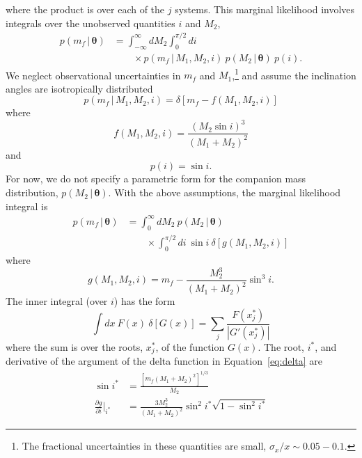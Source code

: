 \documentclass[apjl]{emulateapj}
\newcommand{\given}{\,|\,}
\newcommand{\bs}[1]{\boldsymbol{#1}}
\newcommand{\eqn}{Equation~}
\newcommand{\mf}{m_f}
\begin{document}
where the product is over each of the $j$ systems.  This marginal likelihood involves integrals over the unobserved quantities $i$ and $M_2$,
\begin{align}
    p(\mf \given \bs{\theta}) &= \int_{-\infty}^\infty dM_2 \int_0^{\pi/2} di  \nonumber \\
      & \qquad {} \times p(\mf \given M_1, M_2, i)~p(M_2 \given \bs{\theta})~p(i).
\end{align}
We neglect observational uncertainties in $\mf$ and $M_1$,\footnote{The fractional uncertainties in these quantities are small, $\sigma_x / x \sim 0.05-0.1$.} and assume the inclination angles are isotropically distributed
\begin{equation}
	p(\mf \given M_1, M_2, i) = \delta \left[\mf - f(M_1, M_2, i) \right]
\end{equation}
where
\begin{equation}
	f(M_1, M_2, i) = \frac{(M_2 \sin i)^3}{(M_1 + M_2)^2}
\end{equation}
and
\begin{equation}
	p(i) = \sin i.
\end{equation}
For now, we do not specify a parametric form for the companion mass distribution, $p(M_2 \given \bs{\theta})$. With the above assumptions, the marginal likelihood integral is
\begin{align}
    p(\mf \given \bs{\theta}) &= \int_{0}^\infty dM_2 ~p(M_2 \given \bs{\theta})  \nonumber \\
    & \qquad {} \times \int_0^{\pi/2} di ~\sin i ~ \delta \left[g(M_1,M_2,i) \right]\label{eq:delta}
\end{align}
where
\begin{equation}
	g(M_1,M_2,i) = \mf - \frac{M_2^3}{(M_1+M_2)^2}\sin^3 i.
\end{equation}
The inner integral (over $i$) has the form
\begin{equation}
    \int dx~F(x)~\delta \left[ G(x) \right] = \sum_j \frac{F(x^*_j)}{|G'(x^*_j)|}
\end{equation}
where the sum is over the roots, $x^*_j$, of the function $G(x)$. The root, $i^*$, and derivative of the argument of the delta function in \eqn\ref{eq:delta} are 
\begin{align}
	\sin i^* &= \frac{ \left[\mf(M_1+M_2)^2 \right]^{1/3}}{M_2}\\
	\frac{\partial g}{\partial i}\bigg\rvert_{i^*} &= \frac{3M_2^3}{(M_1+M_2)^2} \sin^2 i^* \sqrt{1 - \sin^2 i^*}
\end{align}
\end{document}
